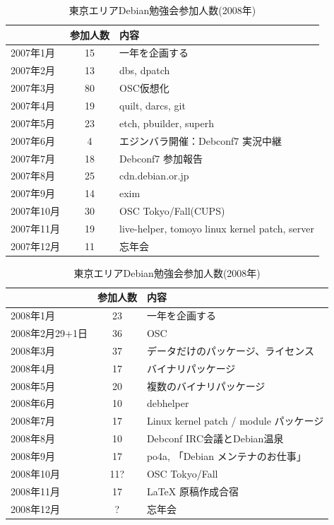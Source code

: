 \documentclass[mingoth,a4paper]{jsarticle}
\begin{document}
\begin{table}[!b]
\begin{minipage}{0.5\hsize}
 \caption{東京エリアDebian勉強会参加人数(2007年)}\label{tab:count2007}
 \begin{center}
  \begin{tabular}{|l|c|p{10em}|}
 \hline
 & 参加人数 & 内容\\
 \hline
2007年1月 & 15 & 一年を企画する \\
2007年2月 & 13 & dbs, dpatch\\ 
2007年3月 & 80 & OSC仮想化 \\
2007年4月 & 19 & quilt, darcs, git\\
2007年5月 & 23 & etch, pbuilder, superh \\   
2007年6月 & 4 & エジンバラ開催：Debconf7 実況中継 \\
2007年7月 & 18 & Debconf7 参加報告\\
2007年8月 & 25 & cdn.debian.or.jp \\   
2007年9月 & 14 & exim \\   
2007年10月 & 30 & OSC Tokyo/Fall(CUPS) \\   
2007年11月 & 19 & live-helper, tomoyo linux kernel patch, server\\
2007年12月 & 11 & 忘年会\\
 \hline
  \end{tabular}
 \end{center}
\end{minipage}
\begin{minipage}{0.5\hsize}
 \caption{東京エリアDebian勉強会参加人数(2008年)}\label{tab:count2008}
 \begin{center}
  \begin{tabular}{|l|c|p{10em}|}
 \hline
 & 参加人数 & 内容\\
 \hline
2008年1月 & 23 & 一年を企画する \\
2008年2月29+1日 & 36 & OSC  \\
2008年3月 & 37 & データだけのパッケージ、ライセンス \\
2008年4月 & 17 & バイナリパッケージ \\
2008年5月 & 20 & 複数のバイナリパッケージ \\
2008年6月 & 10 & debhelper \\
2008年7月 & 17 & Linux kernel patch / module パッケージ \\
2008年8月 & 10 & Debconf IRC会議とDebian温泉 \\
2008年9月 & 17 & po4a, 「Debian メンテナのお仕事」 \\
2008年10月 & 11? & OSC Tokyo/Fall \\
2008年11月 & 17 & LaTeX 原稿作成合宿 \\
2008年12月 & ? & 忘年会 \\
 \hline
  \end{tabular}
 \end{center}
\end{minipage}
\end{table}
\end{document}
